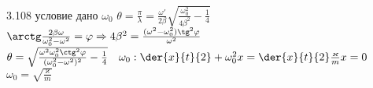 \testCom
{%
	3.108
}
{%
	условие
}
{%
	дано
}
{%
	$\omega_0$
}
{%
	$\theta = \frac{\pi}{\lambda} = \frac{\omega'}{2 \beta} \sqrt{\frac{\omega_0^2}{4 \beta^2} - \frac{1}{4}}$\\
	$\arctg \frac{2 \beta \omega}{\omega_0^2 - \omega^2} = \varphi \Rightarrow 4 \beta^2 = \frac{(\omega^2 - \omega_0^2) \tg^2 \varphi}{\omega^2}$\\
	$\theta = \sqrt{\frac{\omega^2 \omega_0^2 \ctg^2 \varphi}{(\omega_0^2 - \omega^2)^2} - \frac{1}{4}} \quad \omega_0 : \der{x}{t}{2} + \omega_0^2 x = \der{x}{t}{2} \frac{\varkappa}{m} x = 0$\\
	$\omega_0 = \sqrt{\frac{\varkappa}{m}}$\\
}


